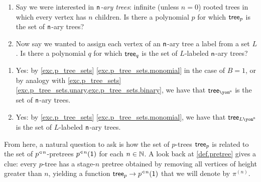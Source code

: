 \documentclass[Book-Poly]{subfiles}
\begin{document}
\begin{exercise} \label{exc.n_ary_trees}
\begin{enumerate}
    \item Say we were interested in \emph{$\mathsf{n}$-ary trees}: infinite (unless $n=0$) rooted trees in which every vertex has $n$ children.
    Is there a polynomial $p$ for which $\mathsf{tree}_p$ is the set of $\mathsf{n}$-ary trees?
    \item \label{exc.n_ary_trees.l_labeled} Now say we wanted to assign each vertex of an $\mathsf{n}$-ary tree a label from a set $L$.
    Is there a polynomial $q$ for which $\mathsf{tree}_q$ is the set of $L$-labeled $\mathsf{n}$-ary trees?\qedhere
\end{enumerate}
\begin{solution}
\begin{enumerate}
    \item Yes: by \cref{exc.p_tree_sets} \cref{exc.p_tree_sets.monomial} in the case of $B=1$, or by analogy with \cref{exc.p_tree_sets} \cref{exc.p_tree_sets.unary,exc.p_tree_sets.binary}, we have that $\tr_{\yon^\ord{n}}$ is the set of $\mathsf{n}$-ary trees.
    \item Yes: by \cref{exc.p_tree_sets} \cref{exc.p_tree_sets.monomial}, we have that $\tr_{L\yon^\ord{n}}$ is the set of $L$-labeled $\mathsf{n}$-ary trees.
\end{enumerate}
\end{solution}
\end{exercise}

From here, a natural question to ask is how the set of $p$-trees $\mathsf{tree}_p$ is related to the set of $p^{\mathbin{\triangleleft}\,n}$-pretrees $p^{\mathbin{\triangleleft}\,n}(\textsf{1})$ for each $n\in\mathbb{N}$.
A look back at \cref{def.pretree} gives a clue: every $p$-tree has a stage-$n$ pretree obtained by removing all vertices of height greater than $n$, yielding a function $\mathsf{tree}_p\to p^{\mathbin{\triangleleft}\,n}(\textsf{1})$ that we will denote by $\pi^{(n)}$.
\end{document}
